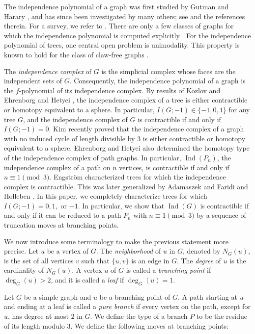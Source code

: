 \documentclass[12pt,amscd]{amsart}
\theoremstyle{definition}
\numberwithin{equation}{section}
\DeclareMathOperator{\Ind}{Ind}
\begin{document}
The independence polynomial of a graph was first studied by Gutman and Harary \cite{GH}, and has since been investigated by many others; see \cite{AMSE, G, HLMP, HL} and the references therein. For a survey, we refer to \cite{LM1}. There are only a few classes of graphs for which the independence polynomial is computed explicitly \cite{HKV, LM3}. For the independence polynomial of trees, one central open problem is unimodality. This property is known to hold for the class of claw-free graphs \cite{CS}.

The \textit{independence complex} of $G$ is the simplicial complex whose faces are the independent sets of $G$. Consequently, the independence polynomial of a graph is the $f$-polynomial of its independence complex. By results of Kozlov \cite{Ko} and Ehrenborg and Hetyei \cite{EH}, the independence complex of a tree is either contractible or homotopy equivalent to a sphere. In particular, \( I(G; -1) \in \{-1, 0, 1\} \) for any tree \( G \), and the independence complex of \( G \) is contractible if and only if \( I(G; -1) = 0 \). Kim \cite{Ki} recently proved that the independence complex of a graph with no induced cycle of length divisible by $3$ is either contractible or homotopy equivalent to a sphere. Ehrenborg and Hetyei also determined the homotopy type of the independence complex of path graphs. In particular, \( \Ind(P_n) \), the independence complex of a path on \( n \) vertices, is contractible if and only if \( n \equiv 1 \pmod{3} \). Engstr\"om \cite{E} characterized trees for which the independence complex is contractible. This was later generalized by Adamaszek \cite{A} and Faridi and Holleben \cite{FH}. In this paper, we completely characterize trees for which \( I(G;-1) = 0, 1, \) or \( -1 \). In particular, we show that \( \Ind(G) \) is contractible if and only if it can be reduced to a path \( P_n \) with \( n \equiv 1 \pmod{3} \) by a sequence of truncation moves at branching points.

We now introduce some terminology to make the previous statement more precise. Let $u$ be a vertex of $G$. The \textit{neighborhood} of $u$ in $G$, denoted by $N_G(u)$, is the set of all vertices $v$ such that $\{u,v\}$ is an edge in $G$. The \textit{degree} of $u$ is the cardinality of $N_G(u)$. A vertex $u$ of $G$ is called a \textit{branching point} if $\deg_G(u) > 2$, and it is called a \textit{leaf} if $\deg_G(u) = 1$. 

Let $G$ be a simple graph and $u$ be a branching point of $G$. A path starting at $u$ and ending at a leaf is called a \textit{pure branch} if every vertex on the path, except for $u$, has degree at most $2$ in $G$. We define the type of a branch $P$ to be the residue of its length modulo $3$. We define the following moves at branching points:
\end{document}
